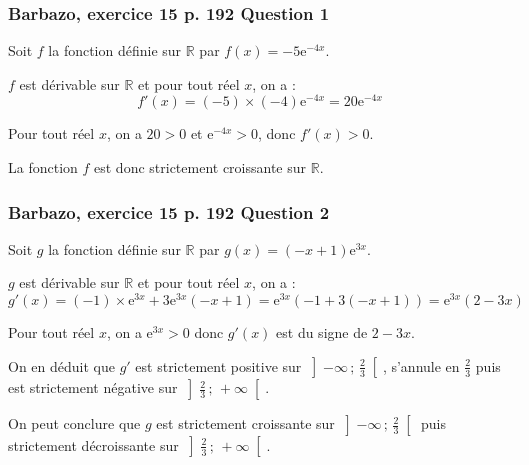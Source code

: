 \documentclass[11pt, hyperref={urlcolor=red,%
            linkcolor=blue, %
            colorlinks=true}]{beamer}
\newcommand{\R}{\mathbb{R}}
\newcommand{\Interoo}[2]{\left]#1\, ;\, #2\right[}
\begin{document}
\begin{frame}
\frametitle{Barbazo, exercice 15 p. 192 Question 1}
\label{exo15}

Soit $f$ la fonction définie sur $\R$ par $f(x)=-5\text{e}^{-4x}$.

$f$ est dérivable sur $\R$ et pour tout réel $x$, on a :
\begin{equation*}
f'(x)=(-5)\times(-4)\text{e}^{-4x}=20\text{e}^{-4x}
\end{equation*}


Pour tout réel $x$, on a $20>0$ et $\text{e}^{-4x}>0$, donc $f'(x)>0$.

La fonction $f$ est donc strictement croissante sur $\R$.
\end{frame}




\begin{frame}
\frametitle{Barbazo, exercice 15 p. 192 Question 2}
\label{exo15}

Soit $g$ la fonction définie sur $\R$ par $g(x)=(-x+1)\text{e}^{3x}$.

$g$ est dérivable sur $\R$ et pour tout réel $x$, on a :
\begin{equation*}
g'(x)=(-1)\times \text{e}^{3x} + 3 \text{e}^{3x}(-x+1)=\text{e}^{3x} (-1+3(-x+1))=\text{e}^{3x} (2-3x)
\end{equation*}


Pour tout réel $x$, on a $\text{e}^{3x}>0$ donc $g'(x)$ est du signe de $2-3x$.

On en déduit que $g'$ est strictement  positive sur $\Interoo{-\infty}{\frac{2}{3}}$, s'annule en $\frac{2}{3}$ puis est strictement négative sur $\Interoo{\frac{2}{3}}{+\infty}$.

On peut conclure que $g$ est strictement  croissante sur $\Interoo{-\infty}{\frac{2}{3}}$ puis  strictement décroissante sur $\Interoo{\frac{2}{3}}{+\infty}$.
\end{frame}
\end{document}
